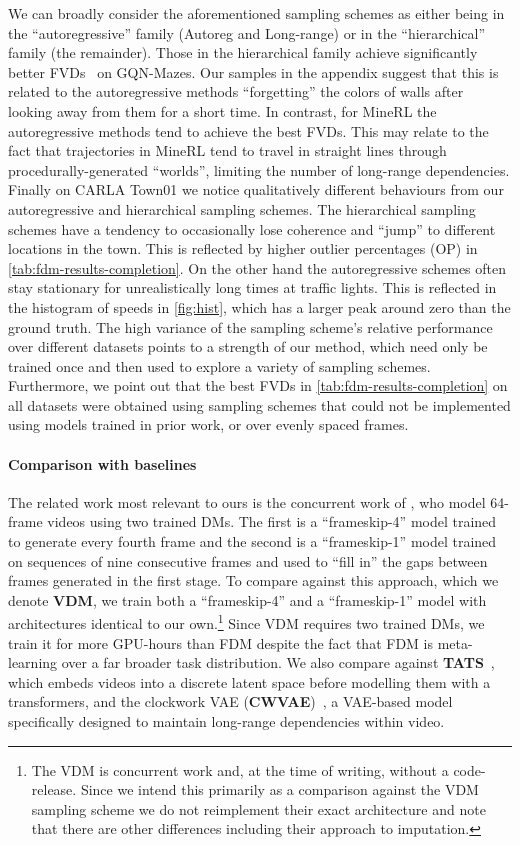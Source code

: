 We can broadly consider the aforementioned sampling schemes as either being in the ``autoregressive'' family (Autoreg and Long-range) or in the ``hierarchical'' family (the remainder). Those in the hierarchical family achieve significantly better FVDs~\cite{unterthiner2018towards} on GQN-Mazes. Our samples in the appendix suggest that this is related to the autoregressive methods ``forgetting'' the colors of walls after looking away from them for a short time. In contrast, for MineRL the autoregressive methods tend to achieve the best FVDs. This may relate to the fact that trajectories in MineRL tend to travel in straight lines through procedurally-generated ``worlds''\cite{guss2019minerl,saxena2021clockwork}, limiting the number of long-range dependencies. 
Finally on CARLA Town01 we notice qualitatively different behaviours from our autoregressive and hierarchical sampling schemes. The hierarchical
sampling schemes have a tendency to occasionally lose coherence and ``jump'' 
to different locations in the town. This is reflected by higher outlier percentages (OP) in \cref{tab:fdm-results-completion}. On the other hand the autoregressive schemes often stay stationary for unrealistically long times at traffic lights. This is reflected in the histogram of speeds in \cref{fig:hist}, which has a larger peak around zero than the ground truth. The high variance of the sampling scheme's relative performance over different datasets points to a strength of our method, which need only be trained once and then used to explore a variety of sampling schemes. Furthermore, we point out that the best FVDs in \cref{tab:fdm-results-completion} on all datasets were obtained using sampling schemes that could not be implemented using models trained in prior work, or over evenly spaced frames.

\paragraph{Comparison with baselines}
The related work most relevant to ours is the concurrent work of \citet{ho2022video}, who model 64-frame videos using two trained DMs. The first is a ``frameskip-4'' model trained to generate every fourth frame and the second is a ``frameskip-1'' model trained on sequences of nine consecutive frames and used to ``fill in'' the gaps between frames generated in the first stage. To compare against this approach, which we denote \textbf{VDM}, we train both a ``frameskip-4'' and a ``frameskip-1'' model with architectures identical to our own.\footnote{The VDM is concurrent work and, at the time of writing, without a code-release. Since we intend this primarily as a comparison against the VDM sampling scheme we do not reimplement their exact architecture and note that there are other differences including their approach to imputation.} Since VDM requires two trained DMs, we train it for more GPU-hours than FDM despite the fact that FDM is meta-learning over a far broader task distribution. We also compare against \textbf{TATS}~\citep{ge2022long}, which embeds videos into a discrete latent space before modelling them with a transformers, and the clockwork VAE (\textbf{CWVAE})~\citep{saxena2021clockwork}, a VAE-based model specifically designed to maintain long-range dependencies within video.

